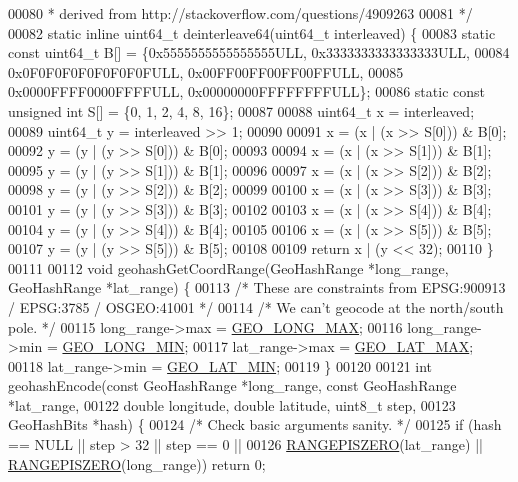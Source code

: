 \begin{DoxyCode}
00080 \textcolor{comment}{ * derived from http://stackoverflow.com/questions/4909263}
00081 \textcolor{comment}{ */}
00082 \textcolor{keyword}{static} \textcolor{keyword}{inline} uint64\_t deinterleave64(uint64\_t interleaved) \{
00083     \textcolor{keyword}{static} \textcolor{keyword}{const} uint64\_t B[] = \{0x5555555555555555ULL, 0x3333333333333333ULL,
00084                                  0x0F0F0F0F0F0F0F0FULL, 0x00FF00FF00FF00FFULL,
00085                                  0x0000FFFF0000FFFFULL, 0x00000000FFFFFFFFULL\};
00086     \textcolor{keyword}{static} \textcolor{keyword}{const} \textcolor{keywordtype}{unsigned} \textcolor{keywordtype}{int} S[] = \{0, 1, 2, 4, 8, 16\};
00087 
00088     uint64\_t x = interleaved;
00089     uint64\_t y = interleaved >> 1;
00090 
00091     x = (x | (x >> S[0])) & B[0];
00092     y = (y | (y >> S[0])) & B[0];
00093 
00094     x = (x | (x >> S[1])) & B[1];
00095     y = (y | (y >> S[1])) & B[1];
00096 
00097     x = (x | (x >> S[2])) & B[2];
00098     y = (y | (y >> S[2])) & B[2];
00099 
00100     x = (x | (x >> S[3])) & B[3];
00101     y = (y | (y >> S[3])) & B[3];
00102 
00103     x = (x | (x >> S[4])) & B[4];
00104     y = (y | (y >> S[4])) & B[4];
00105 
00106     x = (x | (x >> S[5])) & B[5];
00107     y = (y | (y >> S[5])) & B[5];
00108 
00109     \textcolor{keywordflow}{return} x | (y << 32);
00110 \}
00111 
00112 \textcolor{keywordtype}{void} geohashGetCoordRange(GeoHashRange *long\_range, GeoHashRange *lat\_range) \{
00113     \textcolor{comment}{/* These are constraints from EPSG:900913 / EPSG:3785 / OSGEO:41001 */}
00114     \textcolor{comment}{/* We can't geocode at the north/south pole. */}
00115     long\_range->max = \hyperlink{geohash_8h_a86a07918583c89467cf3e459adf513f5}{GEO\_LONG\_MAX};
00116     long\_range->min = \hyperlink{geohash_8h_abf32454c8db6da7cf595d5ac092bb313}{GEO\_LONG\_MIN};
00117     lat\_range->max = \hyperlink{geohash_8h_a831d966c99458d47620ea66a4c6768ab}{GEO\_LAT\_MAX};
00118     lat\_range->min = \hyperlink{geohash_8h_a7da01a8f44929d11f00b2966c834a9b9}{GEO\_LAT\_MIN};
00119 \}
00120 
00121 \textcolor{keywordtype}{int} geohashEncode(\textcolor{keyword}{const} GeoHashRange *long\_range, \textcolor{keyword}{const} GeoHashRange *lat\_range,
00122                   \textcolor{keywordtype}{double} longitude, \textcolor{keywordtype}{double} latitude, uint8\_t step,
00123                   GeoHashBits *hash) \{
00124     \textcolor{comment}{/* Check basic arguments sanity. */}
00125     \textcolor{keywordflow}{if} (hash == NULL || step > 32 || step == 0 ||
00126         \hyperlink{geohash_8h_ad32ba49c768239fda251cd53af812b21}{RANGEPISZERO}(lat\_range) || \hyperlink{geohash_8h_ad32ba49c768239fda251cd53af812b21}{RANGEPISZERO}(long\_range)) \textcolor{keywordflow}{return} 0;

\end{DoxyCode}
